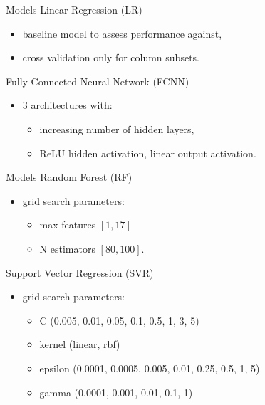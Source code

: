 \documentclass[xcolor=table]{beamer} %
\begin{document}
\begin{frame}{Models}
  \vspace{-0.5cm}
  Linear Regression (LR)
  \begin{itemize}
      \item baseline model to assess performance against,
      \item cross validation only for column subsets.
  \end{itemize}
  Fully Connected Neural Network (FCNN)
  \begin{itemize}
      \item 3 architectures with:
        \begin{itemize}
        	\footnotesize
            \item increasing number of hidden layers,
            \item ReLU hidden activation, linear output activation.
        \end{itemize}
  \end{itemize}
\end{frame}

\begin{frame}{Models}
  \vspace{-0.5cm}
  Random Forest (RF)
  \begin{itemize}
      \item grid search parameters:\\
      \begin{itemize}
      	\footnotesize
      	\item max features $[1, 17]$\\
      	\item N estimators $[80, 100]$.
  	\end{itemize}
  \end{itemize}
  Support Vector Regression (SVR)
  \begin{itemize}
      \item grid search parameters:\\
      \begin{itemize}
      	\footnotesize
        \item C (0.005, 0.01, 0.05, 0.1, 0.5, 1, 3, 5)\\
      	\item kernel (linear, rbf)\\
      	\item epsilon (0.0001, 0.0005, 0.005, 0.01, 0.25, 0.5, 1, 5)\\
      	\item gamma (0.0001, 0.001, 0.01, 0.1, 1)
      \end{itemize}
  \end{itemize}
\end{frame}
\end{document}
